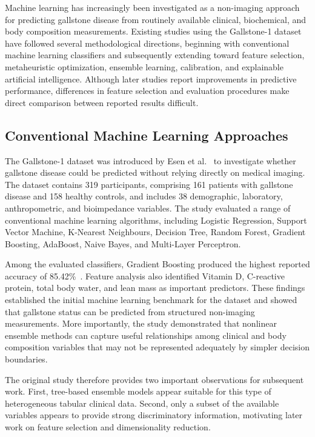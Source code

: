 Machine learning has increasingly been investigated as a non-imaging approach for predicting gallstone disease from routinely available clinical, biochemical, and body composition measurements. Existing studies using the Gallstone-1 dataset have followed several methodological directions, beginning with conventional machine learning classifiers and subsequently extending toward feature selection, metaheuristic optimization, ensemble learning, calibration, and explainable artificial intelligence. Although later studies report improvements in predictive performance, differences in feature selection and evaluation procedures make direct comparison between reported results difficult.

\subsection{Conventional Machine Learning Approaches}

The Gallstone-1 dataset was introduced by Esen et al.~\cite{esen2024early} to investigate whether gallstone disease could be predicted without relying directly on medical imaging. The dataset contains 319 participants, comprising 161 patients with gallstone disease and 158 healthy controls, and includes 38 demographic, laboratory, anthropometric, and bioimpedance variables. The study evaluated a range of conventional machine learning algorithms, including Logistic Regression, Support Vector Machine, K-Nearest Neighbours, Decision Tree, Random Forest, Gradient Boosting, AdaBoost, Naive Bayes, and Multi-Layer Perceptron.

Among the evaluated classifiers, Gradient Boosting produced the highest reported accuracy of 85.42\%~\cite{esen2024early}. Feature analysis also identified Vitamin D, C-reactive protein, total body water, and lean mass as important predictors. These findings established the initial machine learning benchmark for the dataset and showed that gallstone status can be predicted from structured non-imaging measurements. More importantly, the study demonstrated that nonlinear ensemble methods can capture useful relationships among clinical and body composition variables that may not be represented adequately by simpler decision boundaries.

The original study therefore provides two important observations for subsequent work. First, tree-based ensemble models appear suitable for this type of heterogeneous tabular clinical data. Second, only a subset of the available variables appears to provide strong discriminatory information, motivating later work on feature selection and dimensionality reduction.

